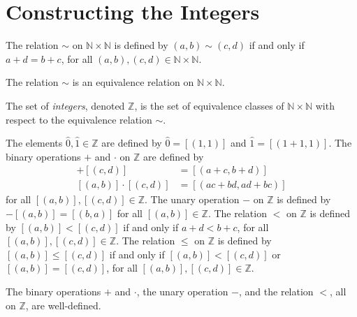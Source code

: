
\section{Constructing the Integers}
\label{int}

\begin{definition} %
	The relation $\sim$ on $\mathbb{N} \times \mathbb{N}$ is defined by $(a, b) \sim (c, d)$ if and only if ${a + d = b + c}$, for all $(a, b), (c, d) \in \mathbb{N} \times \mathbb{N}$.
\end{definition}

\begin{lemma} %
	\label{int:l:equiv}
	The relation $\sim$ is an equivalence relation on $\mathbb{N} \times \mathbb{N}$.
\end{lemma}

\begin{definition} %
	\label{int:d:z_ops}
	The set of \emph{integers}, denoted $\mathbb{Z}$, is the set of equivalence classes of $\mathbb{N} \times \mathbb{N}$ with respect to the equivalence relation $\sim$.

	The elements $\hat{0}, \hat{1} \in \mathbb{Z}$ are defined by $\hat{0} = [(1, 1)]$ and $\hat{1} = [(1 + 1, 1)]$. The binary operations $+$ and $\cdot$ on $\mathbb{Z}$ are defined by
	\begin{align*}
		[(a, b)] + [(c, d)]     & = [(a + c, b + d)]         \\
		[(a, b)] \cdot [(c, d)] & = [(a c + b d, a d + b c)]
	\end{align*}
	for all $[(a, b)], [(c, d)] \in \mathbb{Z}$. The unary operation $-$ on $\mathbb{Z}$ is defined by $-[(a, b)] = [(b, a)]$ for all $[(a, b)] \in \mathbb{Z}$. The relation $<$ on $\mathbb{Z}$ is defined by $[(a, b)] < [(c, d)]$ if and only if $a + d < b + c$, for all $[(a, b)], [(c, d)] \in \mathbb{Z}$. The relation $\leq$ on $\mathbb{Z}$ is defined by $[(a, b)] \leq [(c, d)]$ if and only if $[(a, b)] < [(c, d)]$ or $[(a, b)] = [(c, d)]$, for all $[(a, b)], [(c, d)] \in \mathbb{Z}$.
\end{definition}

\begin{lemma} %
	\label{int:l:well_defined}
	The binary operations $+$ and $\cdot$, the unary operation $-$, and the relation $<$, all on $\mathbb{Z}$, are well-defined.
\end{lemma}

